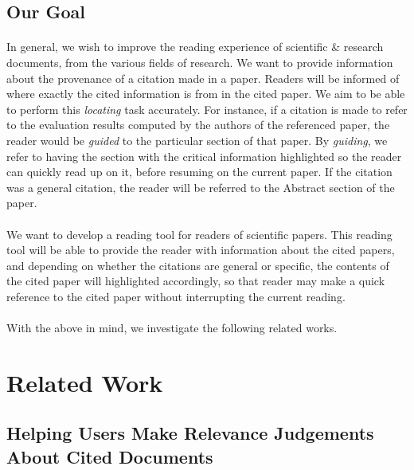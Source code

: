 \documentclass[12 pt]{article}
\begin{document}
\subsection{Our Goal}
\paragraph{}
In general, we wish to improve the reading experience of scientific \& research documents, from the various fields of research. We want to provide information about the provenance of a citation made in a paper. Readers will be informed of where exactly the cited information is from in the cited paper. We aim to be able to perform this \textit{locating} task accurately. For instance, if a citation is made to refer to the evaluation results computed by the authors of the referenced paper, the reader would be \textit{guided} to the particular section of that paper. By \textit{guiding}, we refer to having the section with the critical information highlighted so the reader can quickly read up on it, before resuming on the current paper. If the citation was a general citation, the reader will be referred to the Abstract section of the paper.

\paragraph{}
We want to develop a reading tool for readers of scientific papers. This reading tool will be able to provide the reader with information about the cited papers, and depending on whether the citations are general or specific, the contents of the cited paper will highlighted accordingly, so that reader may make a quick reference to the cited paper without interrupting the current reading.

\paragraph{}
With the above in mind, we investigate the following related works.

\section{Related Work}
\subsection{Helping Users Make Relevance Judgements About Cited Documents}
\end{document}
